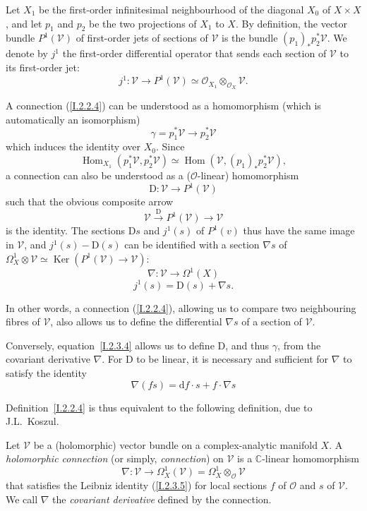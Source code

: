 \documentclass{report}
\theoremstyle{plain}
\theoremstyle{definition}
\newenvironment{definition}[1]
    {\renewcommand\theinnercustomdefinition{#1}\innercustomdefinition}
    {\endinnercustomdefinition}
\newenvironment{env}[1]
    {\renewcommand\theinnercustomenv{#1}\innercustomenv}
    {\endinnercustomenv}
\newcommand{\sh}{\mathscr}
\newcommand{\dd}{\mathrm{d}}
\newcommand{\DD}{\mathrm{D}}
\DeclareMathOperator{\Ker}{Ker}
\DeclareMathOperator{\Hom}{Hom}
\newcommand{\oldpage}[1]{\marginpar{\footnotesize$\Big\vert$ \textit{p.~#1}}}
\begin{document}
\begin{env}{2.3}
\label{I.2.3}
  Let $X_1$ be the first-order infinitesimal neighbourhood of the diagonal $X_0$ of $X\times X$, and let $p_1$ and $p_2$ be the two projections of $X_1$ to $X$.
  By definition, the vector bundle $P^1(\sh{V})$ of first-order jets of sections of $\sh{V}$ is the bundle $(p_1)_*p_2^*\sh{V}$.
  We denote by $j^1$ the first-order differential operator that sends each section of $\sh{V}$ to its first-order jet:
  \[
    j^1\colon \sh{V} \to P^1(\sh{V}) \simeq \sh{O}_{X_1}\otimes_{\sh{O}_X}\sh{V}.
  \]

  A connection (\cref{I.2.2.4}) can be understood as a homomorphism (which is automatically an isomorphism)
  \[
  \label{I.2.3.1}
    \gamma = p_1^*\sh{V} \to p_2^*\sh{V}
  \tag{2.3.1}
  \]
  which induces the identity over $X_0$.
  Since
  \[
    \Hom_{X_1}(p_1^*\sh{V},p_2^*\sh{V}) \simeq \Hom(\sh{V},(p_1)_*p_2^*\sh{V}),
  \]
\oldpage{7}
  a connection can also be understood as a ($\sh{O}$-linear) homomorphism
  \[
  \label{I.2.3.2}
    \DD\colon \sh{V} \to P^1(\sh{V})
  \tag{2.3.2}
  \]
  such that the obvious composite arrow
  \[
    \sh{V}\xrightarrow{\DD} P^1(\sh{V}) \to \sh{V}
  \]
  is the identity.
  The sections $\DD s$ and $j^1(s)$ of $P^1(v)$ thus have the same image in $\sh{V}$, and $j^1(s)-\DD(s)$ can be identified with a section $\nabla s$ of $\Omega_X^1\otimes\sh{V} \simeq \Ker(P^1(\sh{V})\to\sh{V})$:
  \[
  \label{I.2.3.3}
    \nabla\colon \sh{V} \to \Omega^1(X)
  \tag{2.3.3}
  \]
  \[
  \label{I.2.3.4}
    j^1(s) = \DD(s)+\nabla s.
  \tag{2.3.4}
  \]

  In other words, a connection (\cref{I.2.2.4}), allowing us to compare two neighbouring fibres of $\sh{V}$, also allows us to define the differential $\nabla s$ of a section of $\sh{V}$.

  Conversely, equation~\cref{I.2.3.4} allows us to define $\DD$, and thus $\gamma$, from the covariant derivative $\nabla$.
  For $\DD$ to be linear, it is necessary and sufficient for $\nabla$ to satisfy the identity
  \[
  \label{I.2.3.5}
    \nabla(fs) = \dd f\cdot s + f\cdot\nabla s
  \tag{2.3.5}
  \]

  Definition~\cref{I.2.2.4} is thus equivalent to the following definition, due to J.L.~Koszul.
\end{env}

\begin{definition}{2.4}
\label{I.2.4}
  Let $\sh{V}$ be a (holomorphic) vector bundle on a complex-analytic manifold $X$.
  A \emph{holomorphic connection} (or simply, \emph{connection}) on $\sh{V}$ is a $\mathbb{C}$-linear homomorphism
  \[
    \nabla\colon \sh{V} \to \Omega_X^1(\sh{V}) = \Omega_X^1\otimes_{\sh{O}}\sh{V}
  \]
  that satisfies the Leibniz identity (\cref{I.2.3.5}) for local sections $f$ of $\sh{O}$ and $s$ of $\sh{V}$.
  We call $\nabla$ the \emph{covariant derivative} defined by the connection.
\end{definition}
\end{document}
